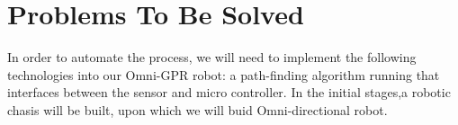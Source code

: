 \section{Problems To Be Solved}
In order to automate the process, we will need to implement the following technologies into our Omni-GPR robot: a path-finding algorithm running that interfaces between the sensor and micro controller. In the initial stages,a robotic chasis will be built, upon which we will buid Omni-directional robot. 
